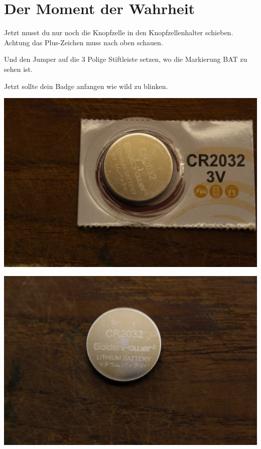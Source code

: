 \documentclass{article}
\begin{document}
\section{Der Moment der Wahrheit}

Jetzt musst du nur noch die Knopfzelle in den Knopfzellenhalter schieben.
Achtung das Plus-Zeichen muss nach oben schauen.

Und den Jumper auf die 3 Polige Stiftleiste setzen, wo die Markierung BAT zu sehen ist.

Jetzt sollte dein Badge anfangen wie wild zu blinken.

\begin{minipage}[b]{0.5\textwidth}
	\includegraphics[width=\textwidth]{Bilder/IMG_5625.JPG}
	\label{fig:}
\end{minipage}
\begin{minipage}[b]{0.5\textwidth}
	\includegraphics[width=\textwidth]{Bilder/IMG_5626.JPG}
	\label{fig:}
\end{minipage}
\end{document}
